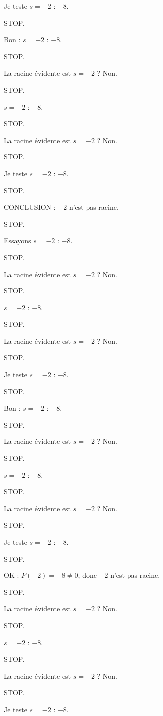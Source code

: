 \documentclass[11pt]{article}
\begin{document}
\begin{exoresolu}
\begin{enumerate}
Je teste $s = -2$ : $-8$. 

STOP. 

Bon : $s = -2$ : $-8$. 

STOP. 

La racine évidente est $s = -2$ ? Non. 

STOP. 

$s = -2$ : $-8$. 

STOP. 

La racine évidente est $s = -2$ ? Non. 

STOP. 

Je teste $s = -2$ : $-8$. 

STOP. 

CONCLUSION : $-2$ n'est pas racine. 

STOP. 

Essayons $s = -2$ : $-8$. 

STOP. 

La racine évidente est $s = -2$ ? Non. 

STOP. 

$s = -2$ : $-8$. 

STOP. 

La racine évidente est $s = -2$ ? Non. 

STOP. 

Je teste $s = -2$ : $-8$. 

STOP. 

Bon : $s = -2$ : $-8$. 

STOP. 

La racine évidente est $s = -2$ ? Non. 

STOP. 

$s = -2$ : $-8$. 

STOP. 

La racine évidente est $s = -2$ ? Non. 

STOP. 

Je teste $s = -2$ : $-8$. 

STOP. 

OK : $P(-2) = -8 \neq 0$, donc $-2$ n'est pas racine. 

STOP. 

La racine évidente est $s = -2$ ? Non. 

STOP. 

$s = -2$ : $-8$. 

STOP. 

La racine évidente est $s = -2$ ? Non. 

STOP. 

Je teste $s = -2$ : $-8$. 


\end{enumerate}
\end{exoresolu}
\end{document}
